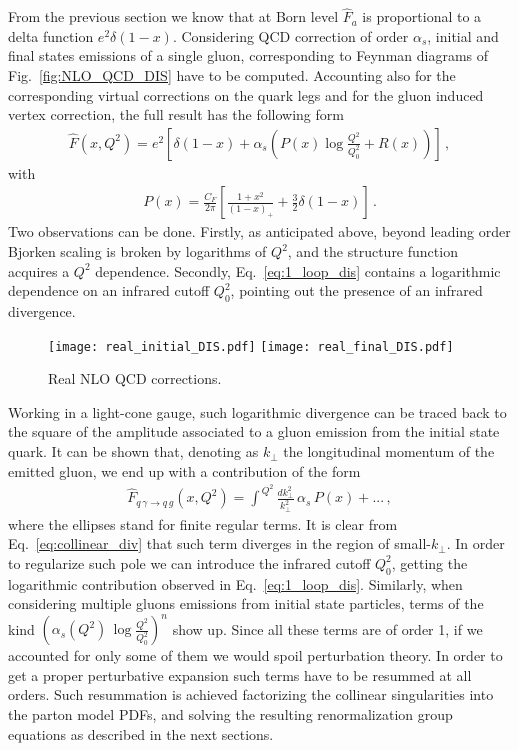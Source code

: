 %
From the previous section we know that at Born level $\hat{F}_a$ is proportional
to a delta function $e^2\delta\left(1-x\right)$. 
Considering QCD correction of order $\alpha_s$,
initial and final states emissions of a single gluon, corresponding to Feynman diagrams of Fig.~\eqref{fig:NLO_QCD_DIS}
have to be computed. 
Accounting also for the corresponding virtual corrections on the quark legs
and for the gluon induced vertex correction, the full result has the following form
\begin{align}
    \label{eq:1_loop_dis}
    \hat{F}\left(x,Q^2\right) = e^2\left[\delta\left(1-x\right) 
    + \alpha_s\left(P\left(x\right)\log\frac{Q^2}{Q_0^2} + R\left(x\right) \right)  \right]\,,
\end{align}
with
\begin{align}
    \label{eq:splitting_function}
    P\left(x\right) = \frac{C_F}{2\pi}\left[\frac{1+x^2}{\left(1-x\right)_+} + \frac{3}{2}\delta\left(1-x\right)\right]\,.
\end{align}
Two observations can be done. Firstly, as anticipated above, beyond leading order
Bjorken scaling is broken by logarithms of $Q^2$, and the structure function acquires a $Q^2$ dependence.
Secondly, Eq.~\eqref{eq:1_loop_dis} contains a logarithmic dependence on an infrared cutoff $Q_0^2$, pointing out 
the presence of an infrared divergence.
\begin{figure}[h]
    \centering
    \texttt{[image: real\_initial\_DIS.pdf]}
    \texttt{[image: real\_final\_DIS.pdf]}
    \caption{Real NLO QCD corrections.}
    \label{fig:NLO_QCD_DIS}
\end{figure}

%
Working in a light-cone gauge, such logarithmic divergence can be traced back to the square of the amplitude associated
to a gluon emission from the initial state quark.
It can be shown that, denoting as $k_{\perp}$ the longitudinal momentum of the emitted gluon,
we end up with a contribution of the form
\begin{align}
    \label{eq:collinear_div}
    \hat{F}_{q\, \gamma \rightarrow q\,g}\left(x,Q^2\right) =
    \int^{\,Q^2}\frac{dk_{\perp}^2}{k_{\perp}^2}\, \alpha_s\, P\left(x\right) + ...\,,
\end{align}
where the ellipses stand for finite regular terms.
It is clear from Eq.~\eqref{eq:collinear_div} that such term diverges in the region of small-$k_{\perp}$.
In order to regularize such pole we can introduce the infrared cutoff $Q_0^2$, getting the logarithmic 
contribution observed in Eq.~\eqref{eq:1_loop_dis}.
Similarly, when considering multiple gluons emissions from initial state particles, terms of the kind 
$\left(\alpha_s\left(Q^2\right)\,\log\frac{Q^2}{Q_0^2}\right)^n$ show up.
Since all these terms are of order 1, if we accounted for only some of them we would spoil perturbation theory.
In order to get a proper perturbative expansion such terms have to be resummed at all orders.
Such resummation is achieved factorizing the collinear singularities into the parton model PDFs,
and solving the resulting renormalization group equations as described in the next sections.

